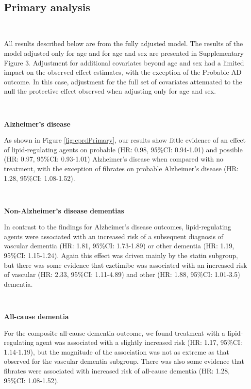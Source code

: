 \documentclass[
]{article}
\begin{document}
~

\hypertarget{primary-analysis}{%
\subsection{Primary analysis}\label{primary-analysis}}

~

All results described below are from the fully adjusted model. The results of the model adjusted only for age and for age and sex are presented in Supplementary Figure 3. Adjustment for additional covariates beyond age and sex had a limited impact on the observed effect estimates, with the exception of the Probable AD outcome. In this case, adjustment for the full set of covariates attenuated to the null the protective effect observed when adjusting only for age and sex.

~

\textbf{Alzheimer's disease}

As shown in Figure \ref{fig:cprdPrimary}, our results show little evidence of an effect of lipid-regulating agents on probable (HR: 0.98, 95\%CI: 0.94-1.01) and possible (HR: 0.97, 95\%CI: 0.93-1.01) Alzheimer's disease when compared with no treatment, with the exception of fibrates on probable Alzheimer's disease (HR: 1.28, 95\%CI: 1.08-1.52).

~

\textbf{Non-Alzheimer's disease dementias}

In contrast to the findings for Alzheimer's disease outcomes, lipid-regulating agents were associated with an increased risk of a subsequent diagnosis of vascular dementia (HR: 1.81, 95\%CI: 1.73-1.89) or other dementia (HR: 1.19, 95\%CI: 1.15-1.24). Again this effect was driven mainly by the statin subgroup, but there was some evidence that ezetimibe was associated with an increased risk of vascular (HR: 2.33, 95\%CI: 1.11-4.89) and other (HR: 1.88, 95\%CI: 1.01-3.5) dementia.

~

\textbf{All-cause dementia}

For the composite all-cause dementia outcome, we found treatment with a lipid-regulating agent was associated with a slightly increased risk (HR: 1.17, 95\%CI: 1.14-1.19), but the magnitude of the association was not as extreme as that observed for the vascular dementia subgroup. There was also some evidence that fibrates were associated with increased risk of all-cause dementia (HR: 1.28, 95\%CI: 1.08-1.52).
\end{document}
